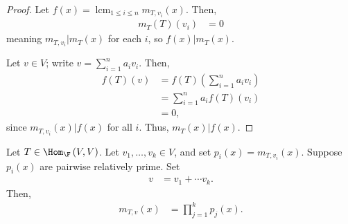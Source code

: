 \documentclass[10pt]{mypackage}
\DeclareMathOperator*{\lcm}{lcm}
\begin{document}
\begin{proof}
  Let $f(x) = \lcm_{1\leq i\leq n} m_{T,v_i}\left(x\right)$. Then,
  \begin{align*}
    m_{T}\left(T\right)\left(v_i\right) &= 0
  \end{align*}
  meaning $m_{T,v_i}|m_{T}(x)$ for each $i$, so $f(x) | m_{T}(x)$.\newline

  Let $v\in V$; write $v = \sum_{i=1}^{n}a_iv_i$. Then,
  \begin{align*}
    f(T)(v) &= f(T)\left(\sum_{i=1}^{n}a_iv_i\right)\\
            &= \sum_{i=1}^{n}a_if(T)\left(v_i\right)\\
            &= 0,
  \end{align*}
  since $m_{T,v_i}(x)|f(x)$ for all $i$. Thus, $m_{T}(x) | f(x)$.
\end{proof}
\begin{lemma}
  Let $T \in \Hom_{\F}\left(V,V\right)$. Let $v_1,\dots,v_k\in V$, and set $p_i(x) = m_{T,v_i}(x)$. Suppose $p_i(x)$ are pairwise relatively prime. Set
  \begin{align*}
    v &= v_1 + \cdots v_k.
  \end{align*}
  Then,
  \begin{align*}
    m_{T,v}\left(x\right) &= \prod_{j=1}^{k}p_j(x).
  \end{align*}
\end{lemma}
\end{document}
